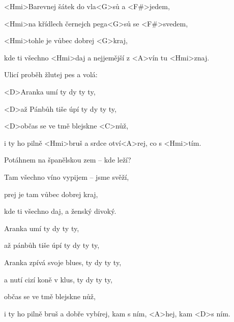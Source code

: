 

\zs
<Hmi>Barevnej šátek {do} vla<G>sů a <F#>jedem,

<Hmi>na křídlech černejch pega<G>sů se <F#>svedem,

<Hmi>tohle je vůbec dobrej <G>kraj,

kde ti všechno <Hmi>daj a nejjemější z <A>vín tu <Hmi>znaj.
\ks

\zs
Ulicí proběh žlutej pes a volá:

\ks

\zr
<D>Aranka umí  ty dy ty ty,

<D>až Pánbůh tiše úpí  ty dy ty ty,

<D>občas se ve tmě blejskne <C>nůž,

i ty ho pilně <Hmi>bruš a srdce otví<A>rej, co s <Hmi>tím.
\kr

\zs
Potáhnem na španělskou zem -- kde leží?

Tam všechno víno vypijem -- jsme svěží,

prej je tam vůbec dobrej kraj,

kde ti všechno daj, a ženský divoký.
\ks

\zr
Aranka umí  ty dy ty ty,

až pánbůh tiše úpí  ty dy ty ty,

Aranka zpívá svoje blues, ty dy ty ty,

a nutí cizí koně v klus, ty dy ty ty,

občas se ve tmě blejskne nůž,

i ty ho pilně bruš a dobře vybírej, kam s ním, <A>hej, kam <D>s ním.
\kr

\kp






